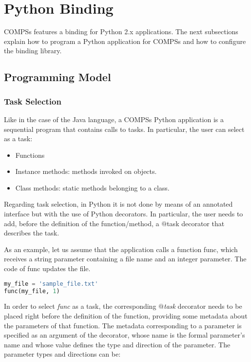 \section{Python Binding}
\label{sec:Python}

COMPSs features a binding for Python 2.x applications. The next subsections explain how to program a Python 
application for COMPSs and how to configure the binding library.

\subsection{Programming Model}

\subsubsection{Task Selection}

Like in the case of the Java language, a COMPSs Python application is a sequential program that contains calls 
to tasks. In particular, the user can select as a task:

\begin{itemize}
 \item Functions
 \item Instance methods: methods invoked on objects.
 \item Class methods: static methods belonging to a class.
\end{itemize}

Regarding task selection, in Python it is not done by means of an annotated interface but with the use of 
Python decorators. In particular, the user needs to add, before the definition of the function/method, 
a $@$task decorator that describes the task.

As an example, let us assume that the application calls a function func, which receives a string parameter 
containing a file name and an integer parameter. The code of func updates the file.

\begin{lstlisting}[language=python]
my_file = 'sample_file.txt'
func(my_file, 1)
\end{lstlisting}

In order to select {\it func} as a task, the corresponding {\it $@$task} decorator needs to be placed right 
before the definition of the function, providing some metadata about the parameters of that function. 
The metadata corresponding to a parameter is specified as an argument of the decorator, whose name is 
the formal parameter’s name and whose value defines the type and direction of the parameter. 
The parameter types and directions can be:

